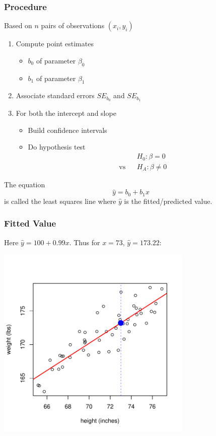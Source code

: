 \documentclass[handout]{beamer}
\newcommand{\blue}[1]{\textcolor{blue2}{#1}}
\begin{document}
\begin{frame}
\frametitle{Procedure}
%
%
Based on $n$ pairs of observations $(x_i, y_i)$
\begin{enumerate}
\pause\item Compute \blue{point estimates}
\begin{itemize}
\item $b_0$ of parameter $\beta_0$
\item $b_1$ of parameter $\beta_1$
\end{itemize}
\pause\item Associate standard errors $SE_{b_0}$ and $SE_{b_1}$
\pause \item For both the intercept and slope
\begin{itemize}
\item Build confidence intervals
\item Do hypothesis test
\begin{eqnarray*}
&& H_0: \beta = 0\\
\mbox{vs}&& H_A: \beta \neq 0 
\end{eqnarray*}
\end{itemize}
\end{enumerate} 
\pause 
The equation
\[
\widehat{y} = b_0 + b_1 x
\]
is called the \blue{least squares line} where $\widehat{y}$ is the \blue{fitted/predicted value}. %
\end{frame}


\begin{frame}
\frametitle{Fitted Value}
Here $\widehat{y} = 100 + 0.99 x$.  Thus for $x=73$, $\widehat{y}=173.22$:
\begin{center}
\includegraphics[width=0.7\textwidth]{figure/average.pdf}
\end{center}
\end{frame}
\end{document}
